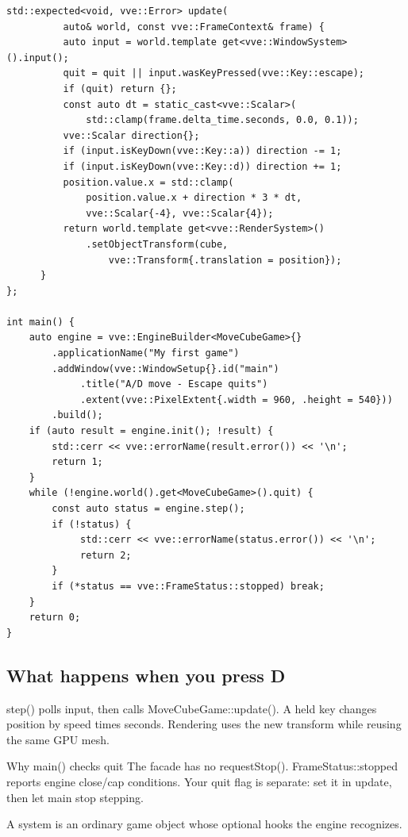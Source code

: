 \documentclass[11pt,a4paper]{article}
\begin{document}
\begin{lstlisting}[language={}]
      std::expected<void, vve::Error> update(
          auto& world, const vve::FrameContext& frame) {
          auto input = world.template get<vve::WindowSystem>().input();
          quit = quit || input.wasKeyPressed(vve::Key::escape);
          if (quit) return {};
          const auto dt = static_cast<vve::Scalar>(
              std::clamp(frame.delta_time.seconds, 0.0, 0.1));
          vve::Scalar direction{};
          if (input.isKeyDown(vve::Key::a)) direction -= 1;
          if (input.isKeyDown(vve::Key::d)) direction += 1;
          position.value.x = std::clamp(
              position.value.x + direction * 3 * dt,
              vve::Scalar{-4}, vve::Scalar{4});
          return world.template get<vve::RenderSystem>()
              .setObjectTransform(cube,
                  vve::Transform{.translation = position});
      }
};

int main() {
    auto engine = vve::EngineBuilder<MoveCubeGame>{}
        .applicationName("My first game")
        .addWindow(vve::WindowSetup{}.id("main")
             .title("A/D move - Escape quits")
             .extent(vve::PixelExtent{.width = 960, .height = 540}))
        .build();
    if (auto result = engine.init(); !result) {
        std::cerr << vve::errorName(result.error()) << '\n';
        return 1;
    }
    while (!engine.world().get<MoveCubeGame>().quit) {
        const auto status = engine.step();
        if (!status) {
             std::cerr << vve::errorName(status.error()) << '\n';
             return 2;
        }
        if (*status == vve::FrameStatus::stopped) break;
    }
    return 0;
}
\end{lstlisting}

\subsection*{What happens when you press D}
step() polls input, then calls MoveCubeGame::update(). A held key changes position by speed times seconds. Rendering uses the new transform while reusing the same GPU mesh.

\begin{remember}
Why main() checks quit The facade has no requestStop(). FrameStatus::stopped reports engine close/cap conditions. Your quit flag is separate: set it in update, then let main stop stepping.
\end{remember}

\label{core-56}
A system is an ordinary game object whose optional hooks the engine recognizes.
\end{document}
